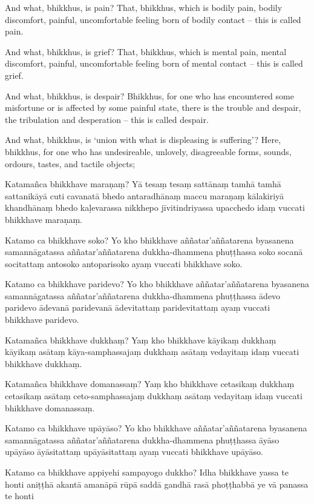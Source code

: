 And what, bhikkhus, is pain? That, bhikkhus, which is bodily pain, bodily
discomfort, painful, uncomfortable feeling born of bodily contact -- this is
called pain.

And what, bhikkhus, is grief? That, bhikkhus, which is mental pain, mental
discomfort, painful, uncomfortable feeling born of mental contact -- this is
called grief.

And what, bhikkhus, is despair? Bhikkhus, for one who has encountered some
misfortune or is affected by some painful state, there is the trouble and
despair, the tribulation and desperation -- this is called despair.

And what, bhikkhus, is `union with what is displeasing is suffering'? Here,
bhikkhus, for one who has undesireable, unlovely, disagreeable forms, sounds,
ordours, tastes, and tactile objects;

\paliPage

Katamañca bhikkhave maraṇaṃ? Yā tesaṃ tesaṃ sattānaṃ tamhā tamhā sattanikāyā
cuti cavanatā bhedo antaradhānaṃ maccu maraṇaṃ kālakiriyā khandhānaṃ bhedo
kaḷevarassa nikkhepo jīvitindriyassa upacchedo idaṃ vuccati bhikkhave maraṇaṃ.

Katamo ca bhikkhave soko? Yo kho bhikkhave aññatar'aññatarena byasanena
samannāgatassa aññatar'aññatarena dukkha-dhammena phuṭṭhassa soko socanā
socitattaṃ antosoko antoparisoko ayaṃ vuccati bhikkhave soko.

Katamo ca bhikkhave paridevo? Yo kho bhikkhave aññatar'aññatarena byasanena
samannāgatassa aññatar'aññatarena dukkha-dhammena phuṭṭhassa ādevo paridevo
ādevanā paridevanā ādevitattaṃ paridevitattaṃ ayaṃ vuccati bhikkhave paridevo.

Katamañca bhikkhave dukkhaṃ? Yaṃ kho bhikkhave kāyikaṃ dukkhaṃ kāyikaṃ asātaṃ
kāya-samphassajaṃ dukkhaṃ asātaṃ vedayitaṃ idaṃ vuccati bhikkhave dukkhaṃ.

Katamañca bhikkhave domanassaṃ? Yaṃ kho bhikkhave cetasikaṃ dukkhaṃ cetasikaṃ
asātaṃ ceto-samphassajaṃ dukkhaṃ asātaṃ vedayitaṃ idaṃ vuccati bhikkhave
domanassaṃ.

Katamo ca bhikkhave upāyāso? Yo kho bhikkhave aññatar'aññatarena byasanena
samannāgatassa aññatar'aññatarena dukkha-dhammena phuṭṭhassa āyāso upāyāso
āyāsitattaṃ upāyāsitattaṃ ayaṃ vuccati bhikkhave upāyāso.

Katamo ca bhikkhave appiyehi sampayogo dukkho? Idha bhikkhave yassa te honti
aniṭṭhā akantā amanāpā rūpā saddā gandhā rasā phoṭṭhabbā ye vā panassa te honti

\englishPage

